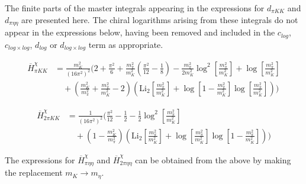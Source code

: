 \documentclass[12pt,a4paper]{article}
\begin{document}
The finite parts of the master integrals appearing in the expressions for ${d}_{\pi K K}$ and ${d}_{\pi \eta \eta}$ are presented here. The chiral logarithms arising from these integrals do not appear in the expressions below, having been removed and included in the $c_{log}$, $c_{log \times log}$, $d_{log}$ or $d_{log \times log}$ term as appropriate.

\begin{align}
\overline{H}^{\chi}_{\pi K K} &= \frac{m_{K}^2}{\left(16 \pi ^2\right)^2} \bigg( 2 + \frac{\pi ^2}{6} + \frac{m_{\pi}^2}{m_{K}^2} \left(\frac{\pi ^2}{12}-\frac{1}{8}\right) - \frac{m_{\pi}^2}{2 m_{K}^2} \log^2 \left[ \frac{m_{\pi}^2}{m_{K}^2} \right] + \log \left[ \frac{m_{\pi}^2}{m_{K}^2} \right]
\nonumber \\ & \quad
 + \left(\frac{m_{K}^2}{m_{\pi}^2}+\frac{m_{\pi}^2}{m_{K}^2}-2\right) 
 \left(\text{Li}_2\left[\frac{m_{\pi}^2}{m_{K}^2}\right]+ \log \left[1-\frac{m_{\pi}^2}{m_{K}^2}\right] \log \left[\frac{m_{\pi}^2}{m_{K}^2}\right]\right) \bigg)
\end{align}

\begin{align}
\overline{H}^{\chi}_{2\pi K K} &= \frac{1}{\left(16 \pi ^2\right)^2} \bigg( \frac{\pi^2}{12} -\frac{1}{2} - \frac{1}{2}\log^2 \left[ \frac{m_{\pi}^2}{m_{K}^2} \right]
\nonumber\\&\quad
 + \left(1-\frac{m_{K}^2}{m_{\pi}^2}\right) \left( \text{Li}_2 \left[ \frac{m_{\pi}^2}{m_{K}^2} \right] + \log \left[ \frac{m_{\pi}^2}{m_{K}^2} \right] \log \left[ 1 - \frac{m_{\pi}^2}{m_{K}^2} \right] \right) \bigg)
\end{align}

The expressions for $ \overline{H}^{\chi}_{\pi \eta \eta}$ and $\overline{H}^{\chi}_{2\pi \eta \eta}$  can be obtained from the above by making the replacement $m_K \rightarrow m_{\eta}$.
\end{document}
